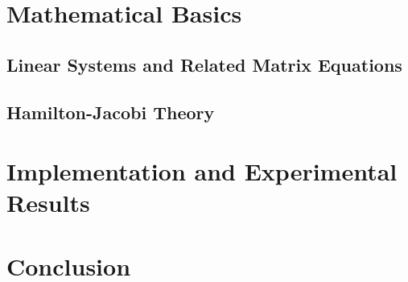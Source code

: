 \documentclass[
  bibliography=totoc,
  listof=totoc,
  oneside,
]{scrbook}
\begin{document}
\frontmatter



\cleardoublepage
{}
\tableofcontents
\listoffigures

\cleardoublepage
{}
\listoftheorems[ignore=remark]

\listoftodos
\todototoc

\mainmatter


\chapter{Mathematical Basics}
\section{Linear Systems and Related Matrix Equations}
\section{Hamilton-Jacobi Theory}






\chapter{Implementation and Experimental Results}
\chapter{Conclusion}

\appendix







\backmatter
\glsaddallunused
\printglossaries
\printbibliography
\end{document}
